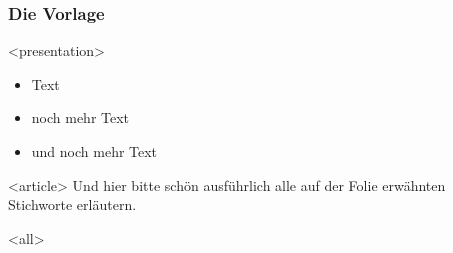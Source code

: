 \begin{frame}[fragile]
\frametitle<presentation>{Die Vorlage}


\mode
<presentation>
\begin{itemize}
 \item Text
 \item noch mehr Text
 \item und noch mehr Text
\end{itemize}


\mode
<article>
Und hier bitte schön ausführlich alle auf der Folie erwähnten Stichworte erläutern.



\mode
<all>

\end{frame}
\newpage

